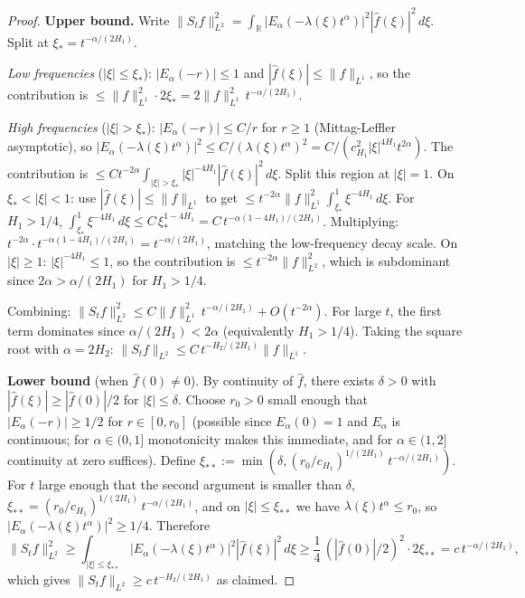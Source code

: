 \documentclass[11pt]{article}
\theoremstyle{definition}
\theoremstyle{remark}
\newcommand{\R}{\mathbb{R}}
\newcommand{\norm}[1]{\| #1 \|}
\begin{document}
\begin{proof}
\textbf{Upper bound.}  Write
$\norm{S_t f}_{L^2}^2
= \int_\R |E_\alpha(-\lambda(\xi) t^\alpha)|^2
|\hat{f}(\xi)|^2\, d\xi$.
Split at $\xi_* = t^{-\alpha/(2H_1)}$.

\emph{Low frequencies} ($|\xi| \leq \xi_*$):
$|E_\alpha(-r)| \leq 1$ and
$|\hat{f}(\xi)| \leq \norm{f}_{L^1}$, so the
contribution is $\leq \norm{f}_{L^1}^2 \cdot
2\xi_* = 2\norm{f}_{L^1}^2\,t^{-\alpha/(2H_1)}$.

\emph{High frequencies} ($|\xi| > \xi_*$):
$|E_\alpha(-r)| \leq C/r$ for $r \geq 1$
(Mittag-Leffler asymptotic), so
$|E_\alpha(-\lambda(\xi) t^\alpha)|^2
\leq C/(\lambda(\xi) t^\alpha)^2
= C/(c_{H_1}^2 |\xi|^{4H_1} t^{2\alpha})$.
The contribution is
$\leq C t^{-2\alpha} \int_{|\xi|>\xi_*}
|\xi|^{-4H_1} |\hat{f}(\xi)|^2\, d\xi$.
Split this region at $|\xi| = 1$.
On $\xi_* < |\xi| < 1$: use
$|\hat{f}(\xi)| \leq \norm{f}_{L^1}$ to get
$\leq t^{-2\alpha} \norm{f}_{L^1}^2
\int_{\xi_*}^1 \xi^{-4H_1}\, d\xi$.
For $H_1 > 1/4$,
$\int_{\xi_*}^1 \xi^{-4H_1}\, d\xi
\leq C\,\xi_*^{1-4H_1}
= C\,t^{-\alpha(1-4H_1)/(2H_1)}$.
Multiplying: $t^{-2\alpha} \cdot
t^{-\alpha(1-4H_1)/(2H_1)}
= t^{-\alpha/(2H_1)}$,
matching the low-frequency decay scale.
On $|\xi| \geq 1$:
$|\xi|^{-4H_1} \leq 1$, so the contribution is
$\leq t^{-2\alpha}\norm{f}_{L^2}^2$,
which is subdominant since
$2\alpha > \alpha/(2H_1)$ for $H_1 > 1/4$.

Combining: $\norm{S_t f}_{L^2}^2
\leq C\norm{f}_{L^1}^2\,t^{-\alpha/(2H_1)}
+ O(t^{-2\alpha})$.
For large $t$, the first term dominates since
$\alpha/(2H_1) < 2\alpha$ (equivalently $H_1 > 1/4$).
Taking the square root with $\alpha = 2H_2$:
$\norm{S_t f}_{L^2}
\leq C\,t^{-H_2/(2H_1)}\norm{f}_{L^1}$.

\textbf{Lower bound} (when $\hat{f}(0) \neq 0$).
By continuity of $\hat{f}$, there exists $\delta > 0$
with $|\hat{f}(\xi)| \geq |\hat{f}(0)|/2$ for
$|\xi| \leq \delta$.  Choose $r_0 > 0$ small enough
that $|E_\alpha(-r)| \geq 1/2$ for $r \in [0, r_0]$
(possible since $E_\alpha(0) = 1$ and $E_\alpha$ is
continuous; for $\alpha \in (0, 1]$ monotonicity
makes this immediate, and for $\alpha \in (1, 2]$
continuity at zero suffices).  Define
$\xi_{**} := \min(\delta,
(r_0/c_{H_1})^{1/(2H_1)}\,t^{-\alpha/(2H_1)})$.
For $t$ large enough that the second argument
is smaller than $\delta$,
$\xi_{**} = (r_0/c_{H_1})^{1/(2H_1)}\,
t^{-\alpha/(2H_1)}$, and on $|\xi| \leq \xi_{**}$
we have $\lambda(\xi) t^\alpha \leq r_0$, so
$|E_\alpha(-\lambda(\xi) t^\alpha)|^2 \geq 1/4$.
Therefore
\[
\norm{S_t f}_{L^2}^2
\geq \int_{|\xi| \leq \xi_{**}}
|E_\alpha(-\lambda(\xi) t^\alpha)|^2
|\hat{f}(\xi)|^2\, d\xi
\geq \frac{1}{4}\,(|\hat{f}(0)|/2)^2 \cdot 2\xi_{**}
= c\,t^{-\alpha/(2H_1)},
\]
which gives $\norm{S_t f}_{L^2}
\geq c\,t^{-H_2/(2H_1)}$ as claimed.
\end{proof}
\end{document}
